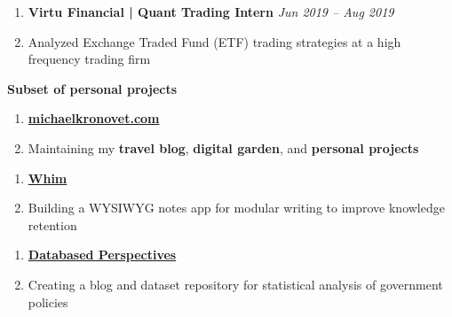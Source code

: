 \documentclass[letterpaper,11pt]{article}
\begin{document}
\begin{enumerate}[leftmargin=10pt]
	\item[] \textbf{\Large Virtu Financial | \textcolor{myBlue}{Quant Trading Intern}}  \cftdotfill{\cftdotsep} \large \textit{\textcolor{myBlue}{Jun 2019 --} Aug 2019}\\
	\item[] \large Analyzed Exchange Traded Fund (ETF) trading strategies at a high frequency trading firm
\end{enumerate}

\begin{mybox}
	\hspace{-8pt} \textbf{\LARGE Subset of personal projects}
\end{mybox}

\begin{enumerate}[leftmargin=10pt]
	\item[] \textbf{\Large \href{https://michaelkronovet.com}{michaelkronovet.com}}\\
	\item[] \large Maintaining my \textcolor{myBlue}{\textbf{travel blog}}, \textbf{digital garden}, and \textcolor{myBlue}{\textbf{personal projects}}
\end{enumerate}

\begin{enumerate}[leftmargin=10pt]
	\item[] \textbf{\Large \href{https://whim.so}{Whim}}\\
	\item[] \large Building a WYSIWYG notes app for modular writing to improve knowledge retention
\end{enumerate}

\begin{enumerate}[leftmargin=10pt]
	\item[] \textbf{\Large \href{https://www.databasedperspectives.com/}{Databased Perspectives}}\\
	\item[] \large Creating a blog and dataset repository for statistical analysis of government policies
\end{enumerate}

\end{document}
